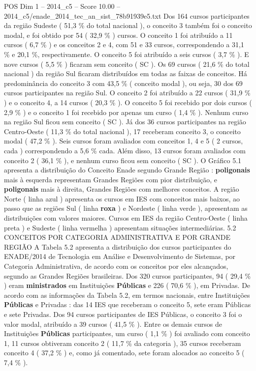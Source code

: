 \begin{textsample}{POS Dim 1 – 2014\_c5 – Score 10.00 – 2014\_c5/enade\_2014\_tec\_an\_sist\_78b91939e5.txt}
Dos 164 cursos participantes da região Sudeste ( 51,3 \% do total nacional ), o conceito 3 também foi o conceito modal, e foi obtido por 54 ( 32,9 \% ) cursos.
O conceito 1 foi atribuído a 11 cursos ( 6,7 \% ) e os conceitos 2 e 4, com 51 e 33 cursos, correspondendo a 31,1 \% e 20,1 \%, respectivamente.
O conceito 5 foi atribuído a seis cursos ( 3,7 \% ).
E nove cursos ( 5,5 \% ) ficaram sem conceito ( SC ).
Os 69 cursos ( 21,6 \% do total nacional ) da região Sul ficaram distribuídos em todas as faixas de conceitos.
Há predominância do conceito 3 com 43,5 \% ( conceito modal ), ou seja, 30 dos 69 cursos participantes na região Sul.
O conceito 2 foi atribuído a 22 cursos ( 31,9 \% ) e o conceito 4, a 14 cursos ( 20,3 \% ).
O conceito 5 foi recebido por dois cursos ( 2,9 \% ) e o conceito 1 foi recebido por apenas um curso ( 1,4 \% ).
Nenhum curso na região Sul ficou sem conceito ( SC ).
Já dos 36 cursos participantes na região Centro-Oeste ( 11,3 \% do total nacional ), 17 receberam conceito 3, o conceito modal ( 47,2 \% ).
Seis cursos foram avaliados com conceitos 1, 4 e 5 ( 2 cursos, cada ) correspondendo a 5,6 \% cada.
Além disso, 13 cursos foram avaliados com conceito 2 ( 36,1 \% ), e nenhum curso ficou sem conceito ( SC ).
O Gráfico 5.1 apresenta a distribuição do Conceito Enade segundo Grande Região : \textbf{poligonais} mais à esquerda representam Grandes Regiões com pior distribuição, e \textbf{poligonais} mais à direita, Grandes Regiões com melhores conceitos.
A região Norte ( linha azul ) apresenta os cursos em IES com conceitos mais baixos, ao passo que as regiões Sul ( linha \textbf{roxa} ) e Nordeste ( linha verde ), apresentam as distribuições com valores maiores.
Cursos em IES da região Centro-Oeste ( linha preta ) e Sudeste ( linha vermelha ) apresentam situações intermediárias. 5.2 CONCEITOS POR CATEGORIA ADMINISTRATIVA E POR GRANDE REGIÃO A Tabela 5.2 apresenta a distribuição dos cursos participantes do ENADE/2014 de Tecnologia em Análise e Desenvolvimento de Sistemas, por Categoria Administrativa, de acordo com os conceitos por eles alcançados, segundo as Grandes Regiões brasileiras.
Dos 320 cursos participantes, 94 ( 29,4 \% ) eram \textbf{ministrados} em Instituições \textbf{Públicas} e 226 ( 70,6 \% ), em Privadas.
De acordo com as informações da Tabela 5.2, em termos nacionais, entre Instituições \textbf{Públicas} e Privadas : das 14 IES que receberam o conceito 5, sete eram Públicas e sete Privadas.
Dos 94 cursos participantes de IES Públicas, o conceito 3 foi o valor modal, atribuído a 39 cursos ( 41,5 \% ).
Entre os demais cursos de Instituições \textbf{Públicas} participantes, um curso ( 1,1 \% ) foi avaliado com conceito 1, 11 cursos obtiveram conceito 2 ( 11,7 \% da categoria ), 35 cursos receberam conceito 4 ( 37,2 \% ) e, como já comentado, sete foram alocados ao conceito 5 ( 7,4 \% ).

\end{textsample}
